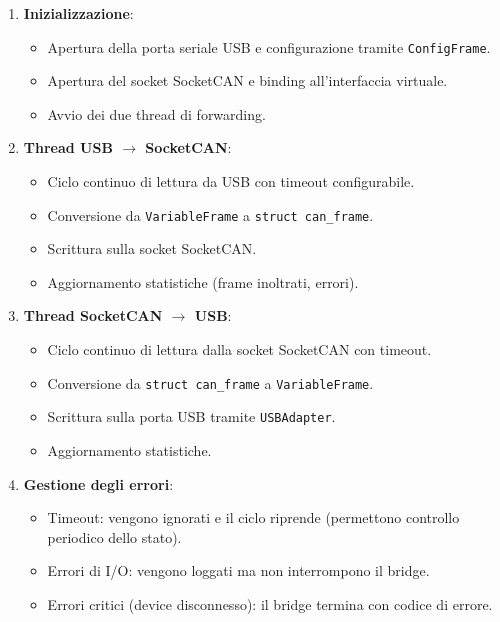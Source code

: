 \begin{enumerate}
    \item \textbf{Inizializzazione}:
          \begin{itemize}
              \item Apertura della porta seriale USB e configurazione tramite \texttt{ConfigFrame}.
              \item Apertura del socket SocketCAN e binding all'interfaccia virtuale.
              \item Avvio dei due thread di forwarding.
          \end{itemize}
    \item \textbf{Thread USB $\to$ SocketCAN}:
          \begin{itemize}
              \item Ciclo continuo di lettura da USB con timeout configurabile.
              \item Conversione da \texttt{VariableFrame} a \texttt{struct can\_frame}.
              \item Scrittura sulla socket SocketCAN.
              \item Aggiornamento statistiche (frame inoltrati, errori).
          \end{itemize}
    \item \textbf{Thread SocketCAN $\to$ USB}:
          \begin{itemize}
              \item Ciclo continuo di lettura dalla socket SocketCAN con timeout.
              \item Conversione da \texttt{struct can\_frame} a \texttt{VariableFrame}.
              \item Scrittura sulla porta USB tramite \texttt{USBAdapter}.
              \item Aggiornamento statistiche.
          \end{itemize}
    \item \textbf{Gestione degli errori}:
          \begin{itemize}
              \item Timeout: vengono ignorati e il ciclo riprende (permettono controllo periodico dello stato).
              \item Errori di I/O: vengono loggati ma non interrompono il bridge.
              \item Errori critici (device disconnesso): il bridge termina con codice di errore.
          \end{itemize}
\end{enumerate}

